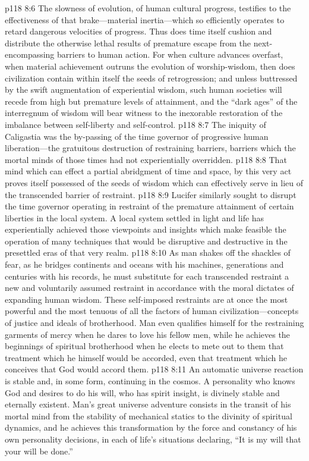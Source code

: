 \vs p118 8:6 The slowness of evolution, of human cultural progress, testifies to the effectiveness of that brake---material inertia---which so efficiently operates to retard dangerous velocities of progress. Thus does time itself cushion and distribute the otherwise lethal results of premature escape from the next\hyp{}encompassing barriers to human action. For when culture advances overfast, when material achievement outruns the evolution of worship\hyp{}wisdom, then does civilization contain within itself the seeds of retrogression; and unless buttressed by the swift augmentation of experiential wisdom, such human societies will recede from high but premature levels of attainment, and the “dark ages” of the interregnum of wisdom will bear witness to the inexorable restoration of the imbalance between self\hyp{}liberty and self\hyp{}control.
\vs p118 8:7 The iniquity of Caligastia was the by\hyp{}passing of the time governor of progressive human liberation---the gratuitous destruction of restraining barriers, barriers which the mortal minds of those times had not experientially overridden.
\vs p118 8:8 That mind which can effect a partial abridgment of time and space, by this very act proves itself possessed of the seeds of wisdom which can effectively serve in lieu of the transcended barrier of restraint.
\vs p118 8:9 Lucifer similarly sought to disrupt the time governor operating in restraint of the premature attainment of certain liberties in the local system. A local system settled in light and life has experientially achieved those viewpoints and insights which make feasible the operation of many techniques that would be disruptive and destructive in the presettled eras of that very realm.
\vs p118 8:10 As man shakes off the shackles of fear, as he bridges continents and oceans with his machines, generations and centuries with his records, he must substitute for each transcended restraint a new and voluntarily assumed restraint in accordance with the moral dictates of expanding human wisdom. These self\hyp{}imposed restraints are at once the most powerful and the most tenuous of all the factors of human civilization---concepts of justice and ideals of brotherhood. Man even qualifies himself for the restraining garments of mercy when he dares to love his fellow men, while he achieves the beginnings of spiritual brotherhood when he elects to mete out to them that treatment which he himself would be accorded, even that treatment which he conceives that God would accord them.
\vs p118 8:11 An automatic universe reaction is stable and, in some form, continuing in the cosmos. A personality who knows God and desires to do his will, who has spirit insight, is divinely stable and eternally existent. Man’s great universe adventure consists in the transit of his mortal mind from the stability of mechanical statics to the divinity of spiritual dynamics, and he achieves this transformation by the force and constancy of his own personality decisions, in each of life’s situations declaring, “It is my will that your will be done.”
